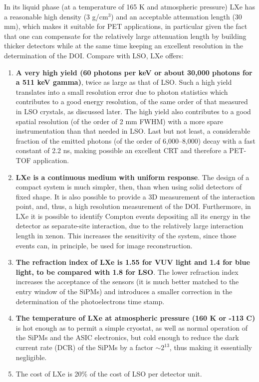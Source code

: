 \documentclass[review]{elsarticle}
\begin{document}
In its liquid phase (at a temperature of 165 K and atmospheric pressure) LXe has a reasonable high density (3 g/cm$^3$) and an acceptable attenuation length (30 mm), which makes it suitable for PET applications, in particular given the fact that one can compensate for the relatively large attenuation length by building thicker detectors while at the same time keeping an excellent resolution in the determination of the DOI. Compare with LSO, LXe offers:
\begin{enumerate}
\item {\bf A very high yield (60 photons per keV or about 30,000 photons for a 511 keV gamma)}, twice as large as that of LSO. Such a high yield translates into a small resolution error due to photon statistics which contributes to a good energy resolution, of the same order of that measured in LSO crystals, as discussed later. The high yield also contributes to a good spatial resolution (of the order of 2 mm FWHM) with a more spare instrumentation than that needed in LSO. Last but not least, a considerable fraction of the emitted photons (of the order of 6,000--8,000) decay with a fast constant of 2.2 ns, making possible an excellent CRT and therefore a PET-TOF application. 
\item {\bf LXe is a continuous medium with uniform response}. The design of a compact system is much simpler, then, than when using solid detectors of fixed shape. It is also possible to provide a 3D measurement of the interaction point, and, thus, a high resolution measurement of the DOI. Furthermore, in LXe it is possible to identify Compton events depositing all its energy in the detector as separate-site interaction, due to the relatively large interaction length in xenon. This increases the sensitivity of the system, since those events can, in principle, be used for image reconstruction. 
\item {\bf The refraction index of LXe is 1.55 for VUV light and 1.4 for blue light, to be compared with 1.8 for LSO}. The lower refraction index increases the acceptance of the sensors (it is much better matched to the entry window of the SiPMs) and introduces a smaller correction in the determination of the photoelectrons time stamp. 
\item {\bf The temperature of LXe at atmospheric pressure (160 K or -113 C)} is hot enough as to permit a simple cryostat, as well as normal operation of the SiPMs and the ASIC electronics, but cold enough to reduce the dark current rate (DCR) of the SiPMs by a factor $\sim 2^{13}$, thus making it essentially negligible. 
\item {The cost} of LXe is 20\% of the cost of LSO per detector unit. 
 \end{enumerate}
\end{document}
